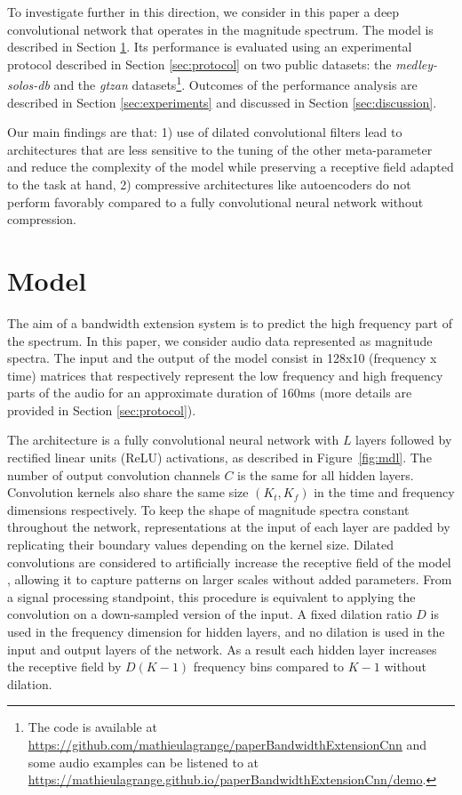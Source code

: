 \documentclass{article}
\begin{document}
To investigate further in this direction, we consider in this paper a deep convolutional network that operates in the magnitude spectrum. The model is described in Section \ref{sec:model}. Its performance is evaluated using an experimental protocol described in Section \ref{sec:protocol} on two public datasets: the \textit{medley-solos-db} and the \textit{gtzan} datasets\footnote{The code is available at \url{https://github.com/mathieulagrange/paperBandwidthExtensionCnn} and some audio examples can be listened to at \url{https://mathieulagrange.github.io/paperBandwidthExtensionCnn/demo}.}. Outcomes of the performance analysis are described in Section \ref{sec:experiments} and discussed in Section \ref{sec:discussion}.

Our main findings are that: 1) use of dilated convolutional filters lead to architectures that are less sensitive to the tuning of the other meta-parameter and reduce the complexity of the model while preserving a receptive field adapted to the task at hand, 2) compressive architectures like autoencoders do not perform favorably compared to a fully convolutional neural network without compression.

\section{Model}
\label{sec:model}

The aim of a bandwidth extension system is to predict the high frequency part of the spectrum. In this paper, we consider audio data represented as magnitude spectra. The input and the output of the model consist in 128x10 (frequency x time) matrices that respectively represent the low frequency and high frequency parts of the audio for an approximate duration of $160$ms (more details are provided in Section \ref{sec:protocol}).

The architecture is a fully convolutional neural network \cite{long2015fully} with $L$ layers followed by rectified linear units (ReLU) activations, as described in Figure~\ref{fig:mdl}. The number of output convolution channels $C$ is the same for all hidden layers. Convolution kernels also share the same size $(K_t, K_f)$ in the time and frequency dimensions respectively. To keep the shape of magnitude spectra constant throughout the network, representations at the input of each layer are padded by replicating their boundary values depending on the kernel size. Dilated convolutions are considered to artificially increase the receptive field of the model \cite{yu2016multi}, allowing it to capture patterns on larger scales without added parameters. From a signal processing standpoint, this procedure is equivalent to applying the convolution on a down-sampled version of the input. A fixed dilation ratio $D$ is used in the frequency dimension for hidden layers, and no dilation is used in the input and output layers of the network. As a result each hidden layer increases the receptive field by $D(K-1)$ frequency bins compared to $K-1$ without dilation.
\end{document}
